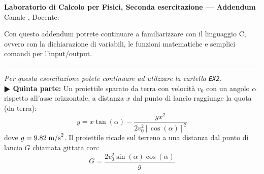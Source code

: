 \documentclass[11pt]{article}
\begin{document}
\pagestyle{empty}

\begin{center}
{\Large \bf  Laboratorio di Calcolo per Fisici, Seconda esercitazione --- Addendum\\[2mm]}
{\large Canale \canale, Docente: \docente}
\end{center}
\vspace{1mm}

\begin{mdframed}[backgroundcolor=panna]
  Con questo addendum potrete continuare a familiarizzare con il linguaggio C,
  ovvero con la dichiarazione di variabili, le funzioni matematiche e semplici
  comandi per l'input/output.
\end{mdframed}
%
%
\hrule
\vspace{2mm}
\textsl{Per questa esercitazione potete continuare ad utilzzare la cartella  \texttt{EX2}.} 
\vspace{0.2cm}\\
\textbf{$\RHD$ Quinta parte:} 
Un proiettile sparato da terra con velocità $v_0$ con un angolo $\alpha$ rispetto all'asse orizzontale, a distanza $x$
dal punto di lancio raggiunge la quota (da terra):
\begin{equation}
y = x \tan (\alpha )-\frac{g x^2}{2 v_0^2 {\left[\cos(\alpha)\right]}^2}   
\end{equation}
dove $g=9.82\;\hbox{m/s}^2$.
Il proiettile ricade sul terreno a una distanza dal punto di lancio $G$ chiamata gittata con:
\begin{equation}
G=\frac{2 v_0^2 \sin (\alpha ) \cos (\alpha )}{g}
\end{equation}
\end{document}

